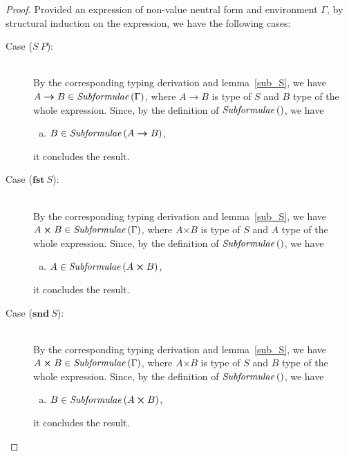 \documentclass[11p,a4paper]{article}
\newcommand{\typarr}[2]{#1\boldsymbol{\rightarrow}#2}
\newcommand{\typprd}[2]{#1\boldsymbol{\times}#2}
\newcommand{\expapp}[2]{#1\ #2}
\newcommand{\expfst}[1]{\mathbf{fst}\ #1}
\newcommand{\expsnd}[1]{\mathbf{snd}\ #1}
\newcommand{\txt}[1]{\text{\textit{#1}}}
\newcommand{\subformulae}[1]{\txt{Subformulae}\,(#1)}
\begin{document}
\begin{proof}
Provided an expression of non-value neutral form and environment
$\Gamma$, by structural induction on the expression, we have the following cases:
\begin{description}
\item[Case ($\expapp{S}{P}$):]\ \\ 
  By the corresponding typing derivation and lemma~\ref{sub_S}, we
  have $\typarr{A}{B} \in \subformulae{\Gamma}$, where $\typarr{A}{B}$
  is type of $S$ and $B$ type of the whole expression. Since, by the
  definition of $\subformulae{}$, we have
  \begin{enumerate}[(a)] 
  \item  $B \in \subformulae{\typarr{A}{B}}$,
  \end{enumerate}
  it concludes the result.
\item[Case ($\expfst{S}$):]\ \\
  By the corresponding typing derivation and lemma~\ref{sub_S}, we
  have $\typprd{A}{B} \in \subformulae{\Gamma}$, where $\typprd{A}{B}$
  is type of $S$ and $A$ type of the whole expression. Since, by the
  definition of $\subformulae{}$, we have
  \begin{enumerate}[(a)] 
  \item $A \in \subformulae{\typprd{A}{B}}$,
  \end{enumerate}
  it concludes the result.
\item[Case ($\expsnd{S}$):]\ \\
  By the corresponding typing derivation and lemma~\ref{sub_S}, we
  have $\typprd{A}{B} \in \subformulae{\Gamma}$, where $\typprd{A}{B}$
  is type of $S$ and $B$ type of the whole expression. Since, by the
  definition of $\subformulae{}$, we have
  \begin{enumerate}[(a)] 
  \item $B \in \subformulae{\typprd{A}{B}}$,
  \end{enumerate}
  it concludes the result.
\end{description}
\end{proof}
\end{document}
